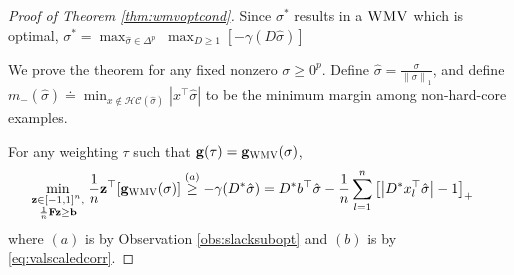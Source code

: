 \documentclass{colt2015} %
\newcommand{\vF}{\mathbf{F}}
\newcommand{\vb}{\mathbf{b}}
\newcommand{\vg}{\mathbf{g}}
\newcommand{\vz}{\mathbf{z}}
\newcommand{\vnorm}[1]{\left\lVert#1\right\rVert} %
\newcommand{\ifn}{\mathbf{1}} %
\newcommand{\abs}[1]{\left| #1 \right|}
\newcommand{\wmv}{\textsc{WMV}}
\newcommand{\hc}{\mathscr{HC}}
\newcommand{\sighat}{\hat{\sigma}}
\newcommand{\lrp}[1]{\left(#1\right)}
\newcommand{\lrsetb}[1]{\left\{#1\right\}}
\begin{document}
\iffalse
\begin{proof}[Proof of Theorem \ref{thm:wmvoptcond}]
Since $\sigma^*$ results in a $\wmv$ which is optimal, 
$\displaystyle \sigma^* = \max_{\sighat \in \Delta^p}\; \max_{D \geq 1} [-\gamma (D \sighat)]$

We prove the theorem for any fixed nonzero $\sigma \geq 0^p$. 
Define $\sighat = \frac{\sigma}{\vnorm{\sigma}_1}$, 
and define $\displaystyle m_{-} (\sighat) \doteq \min_{x \notin \hc (\sighat)} \abs{x^\top \sighat}$ 
to be the minimum margin among non-hard-core examples. 


For any weighting $\tau$ such that $\vg (\tau) = \vg_{\wmv} (\sigma)$, 
\begin{align*}
\min_{\substack{ \vz \in [-1,1]^n , \\ \frac{1}{n} \vF \vz \geq \vb }} \;
&\frac{1}{n} \vz^\top [\vg_{\wmv} (\sigma)]  
\stackrel{(a)}{\geq} - \gamma (D^* \sighat) 
= D^* b^\top \sighat - \frac{1}{n} \sum_{l=1}^n \left[ \abs{D^* x_{l}^\top \sighat} - 1 \right]_{+}
\end{align*}
where $(a)$ is by Observation \ref{obs:slacksubopt} and 
$(b)$ is by \eqref{eq:valscaledcorr}. 



\end{proof}
\end{document}
